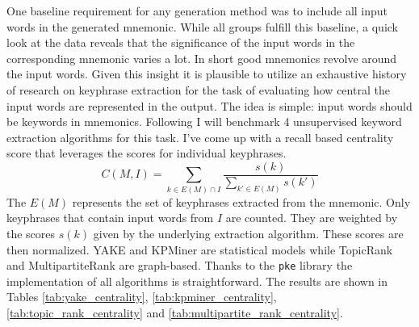 One baseline requirement for any generation method was to include all input words in the generated mnemonic. While all groups fulfill this baseline, a quick look at the data reveals that the significance of the input words in the corresponding mnemonic varies a lot. In short good mnemonics revolve around the input words. Given this insight it is plausible to utilize an exhaustive history of research on keyphrase extraction for the task of evaluating how central the input words are represented in the output. The idea is simple: input words should be keywords in mnemonics. Following I will benchmark 4 unsupervised keyword extraction algorithms for this task. I've come up with a recall based centrality score that leverages the scores for individual keyphrases.
\begin{equation}
    C(M, I) = \sum_{k \in E(M) \cap I} \frac{s(k)}{\sum_{k' \in E(M)} s(k')}
\end{equation}
The $E(M)$ represents the set of keyphrases extracted from the mnemonic. Only keyphrases that contain input words from $I$ are counted. They are weighted by the scores $s(k)$ given by the underlying extraction algorithm. These scores are then normalized.
YAKE and KPMiner are statistical models while TopicRank and MultipartiteRank are graph-based. Thanks to the \texttt{pke} \cite{pke} library the implementation of all algorithms is straightforward. The results are shown in Tables \ref{tab:yake_centrality}, \ref{tab:kpminer_centrality}, \ref{tab:topic_rank_centrality} and \ref{tab:multipartite_rank_centrality}.


